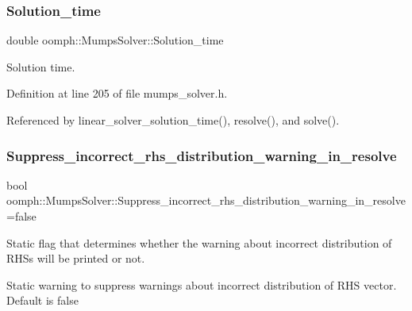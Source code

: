 \mbox{\label{classoomph_1_1MumpsSolver_a6a5a305985a4215cc3456df54f531900}} 
\subsubsection{\texorpdfstring{Solution\+\_\+time}{Solution\_time}}
{\footnotesize\ttfamily double oomph\+::\+Mumps\+Solver\+::\+Solution\+\_\+time\hspace{0.3cm}{\ttfamily [private]}}



Solution time. 



Definition at line 205 of file mumps\+\_\+solver.\+h.



Referenced by linear\+\_\+solver\+\_\+solution\+\_\+time(), resolve(), and solve().

\mbox{\label{classoomph_1_1MumpsSolver_ab0656b67b21335203eb7fbce8c7c7535}} 
\subsubsection{\texorpdfstring{Suppress\+\_\+incorrect\+\_\+rhs\+\_\+distribution\+\_\+warning\+\_\+in\+\_\+resolve}{Suppress\_incorrect\_rhs\_distribution\_warning\_in\_resolve}}
{\footnotesize\ttfamily bool oomph\+::\+Mumps\+Solver\+::\+Suppress\+\_\+incorrect\+\_\+rhs\+\_\+distribution\+\_\+warning\+\_\+in\+\_\+resolve =false\hspace{0.3cm}{\ttfamily [static]}}



Static flag that determines whether the warning about incorrect distribution of R\+H\+Ss will be printed or not. 

Static warning to suppress warnings about incorrect distribution of R\+HS vector. Default is false 

